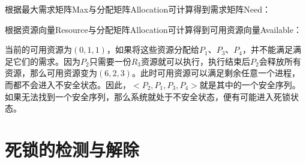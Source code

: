 根据最大需求矩阵Max与分配矩阵Allocation可计算得到需求矩阵Need：

\begin{table}[H]
    \centering
    \caption{需求矩阵Need}
\end{table}

根据资源向量Resource与分配矩阵Allocation可计算得到可用资源向量Available：

\begin{table}[H]
    \centering
    \caption{可用资源向量Available}
\end{table}

当前的可用资源为$ (0, 1, 1) $，如果将这些资源分配给$ P_1 $、$ P_3 $、$ P_4 $，并不能满足满足它们的需求。因为$ P_2 $只需要一份$ R_3 $资源就可以执行，执行结束后$ P_2 $会释放所有资源，那么可用资源变为$ (6, 2, 3) $。此时可用资源可以满足剩余任意一个进程，而都不会进入不安全状态。因此，$ <P_2, P_1, P_3, P_4> $就是其中的一个安全序列。\\

如果无法找到一个安全序列，那么系统就处于不安全状态，便有可能进入死锁状态。

\newpage

\section{死锁的检测与解除}

